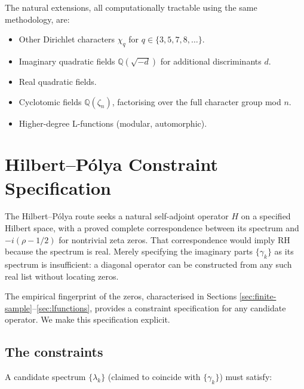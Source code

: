 \documentclass[11pt,a4paper]{article}
\theoremstyle{plain}
\theoremstyle{definition}
\theoremstyle{remark}
\begin{document}
The natural extensions, all computationally tractable using the same
methodology, are:
\begin{itemize}
\item Other Dirichlet characters $\chi_q$ for $q \in \{3, 5, 7, 8, \ldots\}$.
\item Imaginary quadratic fields $\mathbb{Q}(\sqrt{-d})$ for additional
discriminants $d$.
\item Real quadratic fields.
\item Cyclotomic fields $\mathbb{Q}(\zeta_n)$, factorising over the full
character group mod $n$.
\item Higher-degree L-functions (modular, automorphic).
\end{itemize}


\section{Hilbert--Pólya Constraint Specification}
\label{sec:hilbert-polya}

The Hilbert--Pólya route seeks a natural self-adjoint operator $H$ on a
specified Hilbert space, with a proved complete correspondence between its
spectrum and $-i(\rho-1/2)$ for nontrivial zeta zeros. That correspondence
would imply RH because the spectrum is real. Merely specifying the
imaginary parts $\{\gamma_k\}$ as its spectrum is insufficient: a diagonal
operator can be constructed from any such real list without locating zeros.

The empirical fingerprint of the zeros, characterised in Sections
\ref{sec:finite-sample}--\ref{sec:lfunctions}, provides a constraint
specification for any candidate operator. We make this specification
explicit.

\subsection{The constraints}
\label{sec:hp-constraints}

A candidate spectrum $\{\lambda_k\}$ (claimed to coincide with
$\{\gamma_k\}$) must satisfy:
\end{document}
